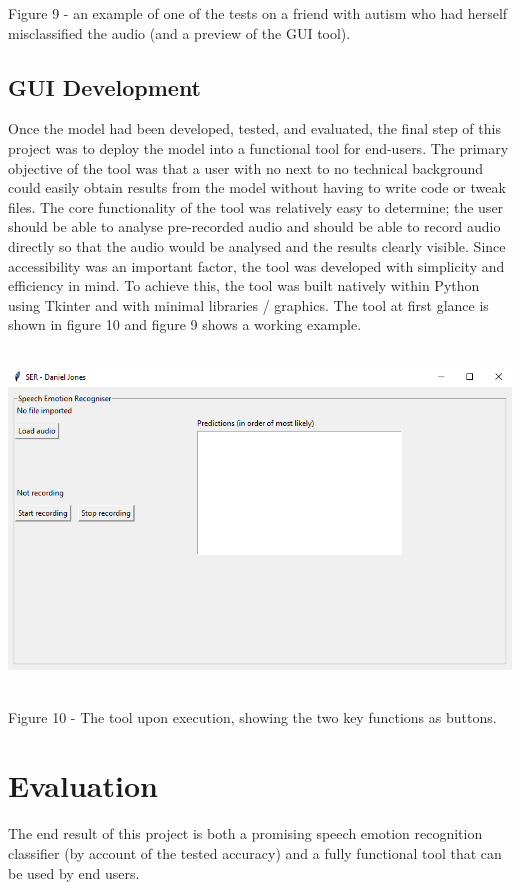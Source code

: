 \documentclass[12pt]{article}
\begin{document}
Figure 9 - an example of one of the tests on a friend with autism who had herself misclassified the audio (and a preview of the GUI tool).
\newpage
\subsection{GUI Development}
Once the model had been developed, tested, and evaluated, the final step of this project was to deploy the model into a functional tool for end-users. The primary objective of the tool was that a user with no next to no technical background could easily obtain results from the model without having to write code or tweak files. The core functionality of the tool was relatively easy to determine; the user should be able to analyse pre-recorded audio and should be able to record audio directly so that the audio would be analysed and the results clearly visible. Since accessibility was an important factor, the tool was developed with simplicity and efficiency in mind. To achieve this, the tool was built natively within Python using Tkinter and with minimal libraries / graphics. The tool at first glance is shown in figure 10 and figure 9 shows a working example.
\begin{center}
\includegraphics[width=16cm, height=9cm]{figure_10_finished_tool}
\end{center}
Figure 10 - The tool upon execution, showing the two key functions as buttons.
\section{Evaluation}
The end result of this project is both a promising speech emotion recognition classifier (by account of the tested accuracy) and a fully functional tool that can be used by end users.
\\
\end{document}
